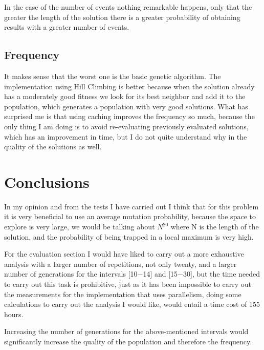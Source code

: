 \documentclass{article}
\begin{document}
    In the case of the number of events nothing remarkable happens, only that the greater the length of the 
    solution there is a greater probability of obtaining results with a greater number of events.

    \subsection{Frequency}

    It makes sense that the worst one is the basic genetic algorithm. The implementation using Hill Climbing 
    is better because when the solution already has a moderately good fitness we look for its best neighbor 
    and add it to the population, which generates a population with very good solutions.
    What has surprised me is that using caching improves the frequency so much, because the only thing I am 
    doing is to avoid re-evaluating previously evaluated solutions, which has an improvement in time, but I 
    do not quite understand why in the quality of the solutions as well.

    \section{Conclusions}

    In my opinion and from the tests I have carried out I think that for this problem it is very 
    beneficial to use an average mutation probability, because the space to explore is very large, 
    we would be talking about $N^{20}$ where N is the length of the solution, and the probability of 
    being trapped in a local maximum is very high.

    For the evaluation section I would have liked to carry out a more exhaustive analysis with a 
    larger number of repetitions, not only twenty, and a larger number of generations for the 
    intervals [10$-$14] and [15$-$30], but the time needed to carry out this task is prohibitive, 
    just as it has been impossible to carry out the measurements for the implementation that uses 
    parallelism, doing some calculations to carry out the analysis I would like, would entail a 
    time cost of 155 hours.

    Increasing the number of generations for the above-mentioned intervals would significantly 
    increase the quality of the population and therefore the frequency.
\end{document}
